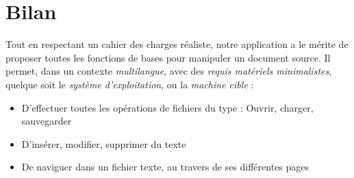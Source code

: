 \section{Bilan}
Tout en respectant un cahier des charges réaliste, notre application a le mérite de proposer toutes les fonctions de bases pour manipuler un document source. Il permet, dans un contexte \emph{multilangue}, avec des \emph{requis matériels minimalistes}, quelque soit le \emph{système d'exploitation}, ou la \emph{machine cible} :
\begin{itemize}
	\item D'effectuer toutes les opérations de fichiers du type : Ouvrir, charger, sauvegarder
	\item D'insérer, modifier, supprimer du texte
	\item De naviguer dans un fichier texte, au travers de ses différentes pages
\end{itemize}



